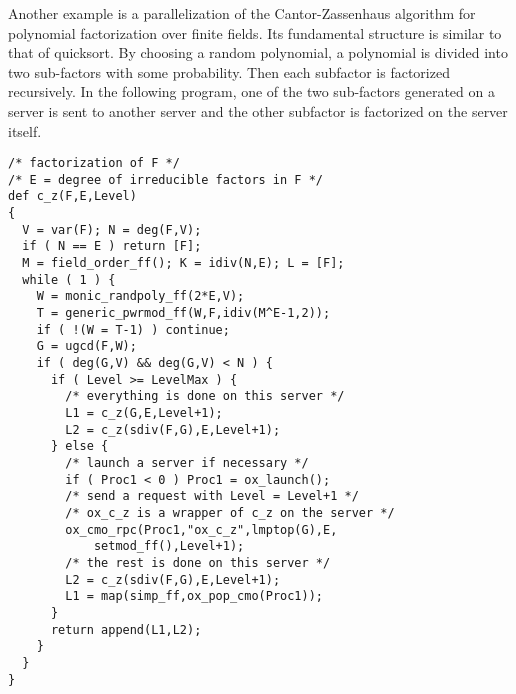 Another example is a parallelization of the Cantor-Zassenhaus
algorithm for polynomial factorization over finite fields. Its
fundamental structure is similar to that of quicksort. By choosing a
random polynomial, a polynomial is divided into two sub-factors with
some probability. Then each subfactor is factorized recursively.  In
the following program, one of the two sub-factors generated on a server
is sent to another server and the other subfactor is factorized on the server
itself. 
\begin{verbatim}
/* factorization of F */
/* E = degree of irreducible factors in F */
def c_z(F,E,Level)
{
  V = var(F); N = deg(F,V);
  if ( N == E ) return [F];
  M = field_order_ff(); K = idiv(N,E); L = [F];
  while ( 1 ) {
    W = monic_randpoly_ff(2*E,V);
    T = generic_pwrmod_ff(W,F,idiv(M^E-1,2));
    if ( !(W = T-1) ) continue;
    G = ugcd(F,W);
    if ( deg(G,V) && deg(G,V) < N ) {
      if ( Level >= LevelMax ) {
        /* everything is done on this server */
        L1 = c_z(G,E,Level+1);
        L2 = c_z(sdiv(F,G),E,Level+1);
      } else {
        /* launch a server if necessary */
        if ( Proc1 < 0 ) Proc1 = ox_launch();
        /* send a request with Level = Level+1 */
        /* ox_c_z is a wrapper of c_z on the server */
        ox_cmo_rpc(Proc1,"ox_c_z",lmptop(G),E,
            setmod_ff(),Level+1);
        /* the rest is done on this server */
        L2 = c_z(sdiv(F,G),E,Level+1);
        L1 = map(simp_ff,ox_pop_cmo(Proc1));
      }
      return append(L1,L2);
    }
  }
}
\end{verbatim}







